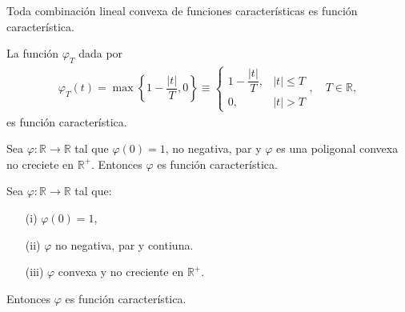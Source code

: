 \begin{cor}
    Toda combinación lineal convexa de funciones características es función característica.
\end{cor}

\begin{prop}
    La función $\varphi_T$ dada por 
    \begin{align*}
        \varphi_T(t) = \max \left\{ 1 - \dfrac{|t|}{T},0 \right\} \equiv \begin{cases}
            1 - \dfrac{|t|}{T}, & |t| \leq T \\
            0, & |t| > T
        \end{cases}, \quad T \in \mathbb{R},
    \end{align*}
    es función característica.
\end{prop}

\begin{lema}
    Sea $\varphi : \mathbb{R} \longrightarrow \mathbb{R}$ tal que $\varphi(0) = 1$, no negativa, par y $\varphi$ es una poligonal convexa no creciete en $\mathbb{R}^+$. Entonces $\varphi$ es función característica.
\end{lema}

\begin{teo}
    Sea $\varphi: \mathbb{R} \longrightarrow \mathbb{R}$ tal que:
    \begin{enumerate}
        \item[(i)] $\varphi(0) = 1$,
        \item[(ii)] $\varphi$ no negativa, par y contiuna.
        \item[(iii)] $\varphi$ convexa y no creciente en $\mathbb{R}^+$.
    \end{enumerate}
    Entonces $\varphi$ es función característica.
\end{teo}